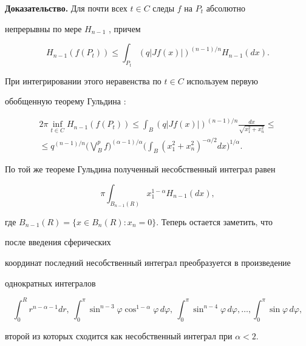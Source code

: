  


{\bf Доказательство.} Для почти всех $t\in C$ следы $f$ на $P_t$ абсолютно 


непрерывны по мере $H_{n-1}$ \cite{3}, причем 


$$ 


H_{n-1}(f(P_t))\le\int_{P_t}(q|J f(x)|)^{(n-1)/n} 


H_{n-1}(dx). 


$$ 


При интегрировании этого неравенства по $t\in C$ используем первую 


обобщенную теорему Гульдина \cite{4}: 


\begin{multline*} 


2\pi\inf_{t\in C}H_{n-1}(f(P_t))\le\int_B(q|J f(x)|)^{(n-1)/n} 


\frac{dx}{\sqrt{x^2_1+x^2_n}}\le \\ 


% 


\le q^{(n-1)/n}\Big(\bigvee^p_B f\Big)^{(\alpha-1)/\alpha} 


\bigg(\int_B(x^2_1+x^2_n)^{-\alpha/2}dx\bigg)^{1/\alpha}. 


\end{multline*} 


По той же теореме Гульдина полученный несобственный интеграл равен 


$$ 


\pi\int_{B_{n-1}(R)}x^{1-\alpha}_1 H_{n-1}(dx), 


$$ 


где $B_{n-1}(R)=\{x\in B_n(R):x_n=0\}$. Теперь остается заметить, что 


после введения сферических 


координат последний несобственный интеграл преобразуется в произведение 


однократных интегралов 


$$ 


\int^R_0 r^{n-\alpha-1}dr,\ \int^\pi_0 \sin^{n-3}\varphi 


\cos^{1-\alpha}\varphi\,d\varphi,\ 


\int^\pi_0 \sin^{n-4}\varphi\,d\varphi,\dotsc, 


\int^\pi_0 \sin\varphi\,d\varphi, 


$$ 


второй из которых сходится как несобственный интеграл при $\alpha<2$. 


